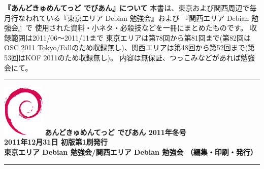 \documentclass[mingoth,a4paper]{jsarticle}
\begin{document}
\printindex


\newpage
\thispagestyle{empty}\mbox{}
\newpage

\thispagestyle{empty}
{
\large
\begin{itembox}{\bf 『あんどきゅめんてっど でびあん』について}
本書は、東京および関西周辺で毎月行なわれている『東京エリア Debian 勉強会』および
『関西エリア Debian 勉強会』で
使用された資料・小ネタ・必殺技などを一冊にまとめたものです。
収録範囲は2011/06〜2011/11まで
東京エリアは第78回から第81回まで(第82回はOSC 2011 Tokyo/Fallのため収録無し)、関西エリアは第48回から第52回まで(第53回はKOF 2011のため収録無し)。
内容は無保証、つっこみなどがあれば勉強会にて。
\end{itembox}
}

\vspace*{15cm}
{\color{dancerlightblue}\rule{\hsize}{1mm}}
\vspace{2mm}
\includegraphics[width=2cm]{image200502/openlogo-nd.eps}
\noindent \Large \bf あんどきゅめんてっど でびあん 2011年冬号\\
\noindent \normalfont 2011年12月31日 \hspace{5mm}  初版第1刷発行\\
\noindent \normalfont 東京エリア Debian 勉強会/関西エリア Debian 勉強会 （編集・印刷・発行）\\
{\color{dancerdarkblue}\rule{\hsize}{1mm}}
\end{document}
